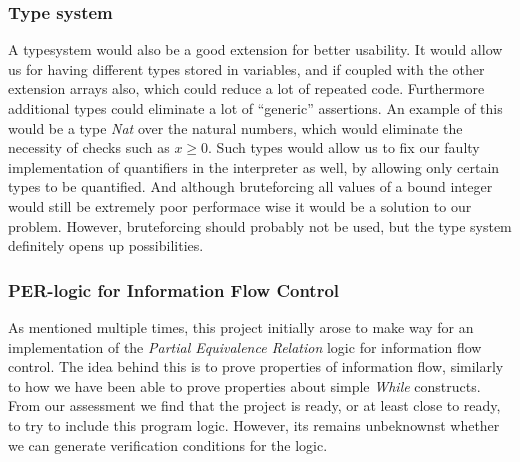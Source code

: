 \subsubsection{Type system}
A typesystem would also be a good extension for better usability. 
It would allow us for having different types stored in variables, and if coupled with the other extension arrays also, which could reduce a lot of repeated code. 
Furthermore additional types could eliminate a lot of ``generic'' assertions. 
An example of this would be a type \textit{Nat} over the natural numbers, which would eliminate the necessity of checks such as $x \ge 0$. 
Such types would allow us to fix our faulty implementation of quantifiers in the interpreter as well, by allowing only certain types to be quantified. 
And although bruteforcing all values of a bound integer would still be extremely poor performace wise it would be a solution to our problem. However, bruteforcing should probably not be used, but the type system definitely opens up possibilities.

\subsubsection{PER-logic for Information Flow Control}
As mentioned multiple times, this project initially arose to make way for an implementation of the \textit{Partial Equivalence Relation} logic for information flow control\cite{Filinski-Jensen-Larsen:Unpublished-IFC}. 
The idea behind this is to prove properties of information flow, similarly to how we have been able to prove properties about simple \textit{While} constructs. 
From our assessment we find that the project is ready, or at least close to ready, to try to include this program logic. 
However, its remains unbeknownst whether we can generate verification conditions for the logic.
